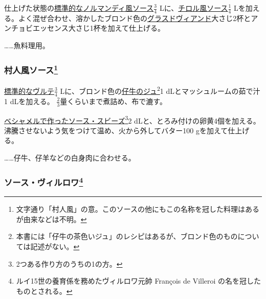 \begin{recette}

 

仕上げた状態の\protect\hyperlink{sauce-normande}{標準的なノルマンディ風ソース}\(\frac{3}{4}\)
Lに、\protect\hyperlink{sauce-tyrolienne}{チロル風ソース}\(\frac{1}{4}\)
Lを加える。よく混ぜ合わせ、溶かしたブロンド色の\protect\hyperlink{glace-de-viande}{グラスドヴィアンド}大さじ2杯とアンチョビエッセンス大さじ1杯を加えて仕上げる。

\ldots{}\ldots{}魚料理用。

\hypertarget{sauce-villageoise}{%
\subsubsection[村人風ソース]{\texorpdfstring{村人風ソース\footnote{文字通り「村人風」の意。このソースの他にもこの名称を冠した料理はあるが由来などは不明。}}{村人風ソース}}\label{sauce-villageoise}}



\protect\hyperlink{veloute}{標準的なヴルテ}\(\frac{3}{4}\)
Lに、ブロンド色の\protect\hyperlink{jus-de-veau-brun}{仔牛のジュ}\footnote{本書には「仔牛の茶色いジュ」のレシピはあるが、ブロンド色のものについては記述がない。}1
dLとマッシュルームの茹で汁1 dLを加える。
\(\frac{2}{3}\)量くらいまで煮詰め、布で漉す。

\protect\hyperlink{sauce-soubise}{ベシャメルで作ったソース・スビーズ}\footnote{2つある作り方のうちの1の方。}2
dLと、とろみ付けの卵黄4個を加える。沸騰させないよう気をつけて温め、火から外してバター100
gを加えて仕上げる。

\ldots{}\ldots{}仔牛、仔羊などの白身肉に合わせる。

\hypertarget{sauce-villeroy}{%
\subsubsection[ソース・ヴィルロワ]{\texorpdfstring{ソース・ヴィルロワ\footnote{ルイ15世の養育係を務めたヴィルロワ元帥
  François de Villeroi の名を冠したものとされる。}}{ソース・ヴィルロワ}}\label{sauce-villeroy}}


\end{recette}
